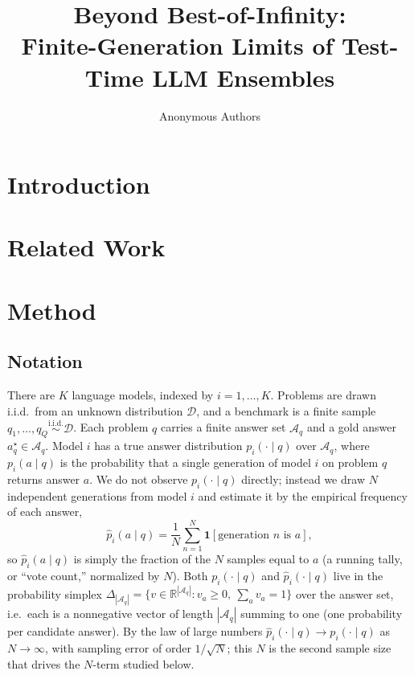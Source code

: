 \documentclass{article} %
\title{Beyond Best-of-Infinity:\\ Finite-Generation Limits of Test-Time LLM Ensembles}
\author{Anonymous Authors}
\providecommand{\R}{\mathbb{R}}
\providecommand{\D}{\mathcal{D}}
\providecommand{\Aq}{\mathcal{A}_q}
\providecommand{\phat}{\widehat{p}}
\begin{document}
\maketitle


\begin{abstract}

\end{abstract}


\section{Introduction}
\label{sec:intro}


\section{Related Work}
\label{sec:related}


\section{Method}
\label{sec:method}

\subsection{Notation}
\label{sec:method-notation}
There are $K$ language models, indexed by $i=1,\dots,K$. Problems are drawn
i.i.d.\ from an unknown distribution $\D$, and a benchmark is a finite sample
$q_1,\dots,q_Q \overset{\text{i.i.d.}}{\sim} \D$. Each problem $q$ carries a
finite answer set $\Aq$ and a gold answer $a_q^\star \in \Aq$. Model $i$ has a
true answer distribution $p_i(\cdot\mid q)$ over $\Aq$, where $p_i(a\mid q)$ is
the probability that a single generation of model $i$ on problem $q$ returns
answer $a$. We do not observe $p_i(\cdot\mid q)$ directly; instead we draw $N$
independent generations from model $i$ and estimate it by the empirical frequency
of each answer,
\begin{equation}
\label{eq:phat}
\phat_i(a\mid q) = \frac1N\sum_{n=1}^N \mathbf 1[\text{generation }n\text{ is }a],
\end{equation}
so $\phat_i(a\mid q)$ is simply the fraction of the $N$ samples equal to $a$
(a running tally, or ``vote count,'' normalized by $N$). Both $p_i(\cdot\mid q)$
and $\phat_i(\cdot\mid q)$ live in the probability simplex
$\Delta_{|\Aq|}=\{v\in\R^{|\Aq|}:v_a\ge 0,\ \sum_a v_a=1\}$ over the answer set,
i.e.\ each is a nonnegative vector of length $|\Aq|$ summing to one (one
probability per candidate answer). By the law of large numbers
$\phat_i(\cdot\mid q)\to p_i(\cdot\mid q)$ as $N\to\infty$, with sampling error of
order $1/\sqrt N$; this $N$ is the second sample size that drives the $N$-term
studied below.
\end{document}
